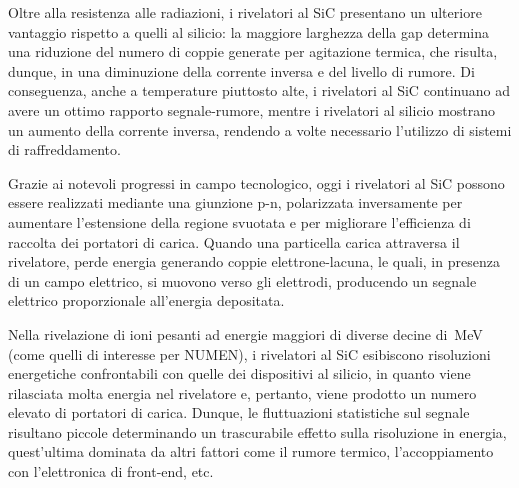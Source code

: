 Oltre alla resistenza alle radiazioni, i rivelatori al SiC presentano un ulteriore vantaggio rispetto a quelli al silicio: la maggiore larghezza della gap determina una riduzione del numero di coppie generate per agitazione termica, che risulta, dunque, in una diminuzione della corrente inversa e del livello di rumore.
Di conseguenza, anche a temperature piuttosto alte, i rivelatori al SiC continuano ad avere un ottimo rapporto segnale-rumore, mentre i rivelatori al silicio mostrano un aumento della corrente inversa, rendendo a volte necessario l'utilizzo di sistemi di raffreddamento.

Grazie ai notevoli progressi in campo tecnologico, oggi i rivelatori al SiC possono essere realizzati mediante una giunzione p-n, polarizzata inversamente per aumentare l'estensione della regione svuotata e per migliorare l'efficienza di raccolta dei portatori di carica.
Quando una particella carica attraversa il rivelatore, perde energia generando coppie elettrone-lacuna, le quali, in presenza di un campo elettrico, si muovono verso gli elettrodi, producendo un segnale elettrico proporzionale all'energia depositata.

Nella rivelazione di ioni pesanti ad energie maggiori di diverse decine di~MeV (come quelli di interesse per NUMEN), i rivelatori al SiC esibiscono risoluzioni energetiche confrontabili con quelle dei dispositivi al silicio, in quanto viene rilasciata molta energia nel rivelatore e, pertanto, viene prodotto un numero elevato di portatori di carica.
Dunque, le fluttuazioni statistiche sul segnale risultano piccole determinando un trascurabile effetto sulla risoluzione in energia, quest'ultima dominata da altri fattori come il rumore termico, l'accoppiamento con l'elettronica di front-end, etc.

